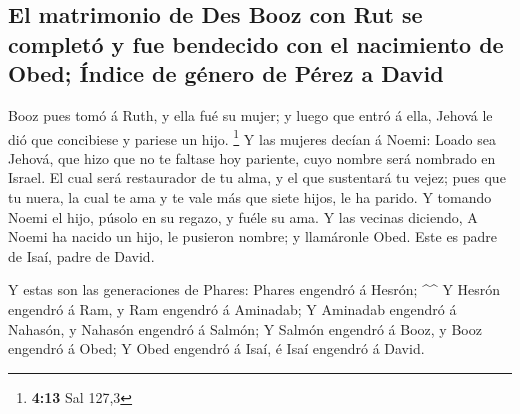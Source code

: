 \hypertarget{el-matrimonio-de-des-booz-con-rut-se-completuxf3-y-fue-bendecido-con-el-nacimiento-de-obed-uxedndice-de-guxe9nero-de-puxe9rez-a-david}{%
\subsection{El matrimonio de Des Booz con Rut se completó y fue
bendecido con el nacimiento de Obed; Índice de género de Pérez a
David}\label{el-matrimonio-de-des-booz-con-rut-se-completuxf3-y-fue-bendecido-con-el-nacimiento-de-obed-uxedndice-de-guxe9nero-de-puxe9rez-a-david}}

 Booz pues tomó á Ruth, y ella fué su mujer; y luego que
entró á ella, Jehová le dió que concibiese y pariese un hijo.
\footnote{\textbf{4:13} Sal 127,3}  Y las mujeres decían
á Noemi: Loado sea Jehová, que hizo que no te faltase hoy pariente, cuyo
nombre será nombrado en Israel.  El cual será restaurador
de tu alma, y el que sustentará tu vejez; pues que tu nuera, la cual te
ama y te vale más que siete hijos, le ha parido.  Y
tomando Noemi el hijo, púsolo en su regazo, y fuéle su ama.
 Y las vecinas diciendo, A Noemi ha nacido un hijo, le
pusieron nombre; y llamáronle Obed. Este es padre de Isaí, padre de
David.

 Y estas son las generaciones de Phares: Phares engendró
á Hesrón; \^{}\^{}  Y Hesrón engendró á Ram, y Ram
engendró á Aminadab;  Y Aminadab engendró á Nahasón, y
Nahasón engendró á Salmón;  Y Salmón engendró á Booz, y
Booz engendró á Obed;  Y Obed engendró á Isaí, é Isaí
engendró á David.

